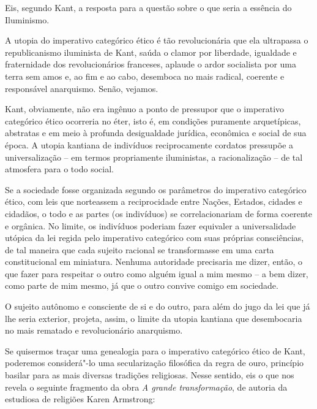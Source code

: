 Eis, segundo Kant, a resposta para a questão sobre o que seria a
essência do Iluminismo.

A utopia do imperativo categórico ético é tão revolucionária que ela
ultrapassa o republicanismo iluminista de Kant, saúda o clamor por
liberdade, igualdade e fraternidade dos revolucionários franceses,
aplaude o ardor socialista por uma terra sem amos e, ao fim e ao cabo,
desemboca no mais radical, coerente e responsável anarquismo. Senão,
vejamos.

Kant, obviamente, não era ingênuo a ponto de pressupor que o imperativo
categórico ético ocorreria no éter, isto é, em condições puramente
arquetípicas, abstratas e em meio à profunda desigualdade jurídica,
econômica e social de sua época. A utopia kantiana de indivíduos
reciprocamente cordatos pressupõe a universalização -- em termos
propriamente iluministas, a racionalização -- de tal atmosfera para o
todo social.

Se a sociedade fosse organizada segundo os parâmetros do imperativo
categórico ético, com leis que norteassem a reciprocidade entre Nações,
Estados, cidades e cidadãos, o todo e as partes (os indivíduos) se
correlacionariam de forma coerente e orgânica. No limite, os indivíduos
poderiam fazer equivaler a universalidade utópica da lei regida pelo
imperativo categórico com suas próprias consciências, de tal maneira que
cada sujeito racional se transformasse em uma carta constitucional em
miniatura. Nenhuma autoridade precisaria me dizer, então, o que fazer
para respeitar o outro como alguém igual a mim mesmo -- a bem dizer,
como parte de mim mesmo, já que o outro convive comigo em sociedade.

O sujeito autônomo e consciente de si e do outro, para além do jugo da
lei que já lhe seria exterior, projeta, assim, o limite da utopia
kantiana que desembocaria no mais rematado e revolucionário anarquismo.

Se quisermos traçar uma genealogia para o imperativo categórico ético de
Kant, poderemos considerá"-lo uma secularização filosófica da regra de
ouro, princípio basilar para as mais diversas tradições religiosas.
Nesse sentido, eis o que nos revela o seguinte fragmento da obra \emph{A
grande transformação}, de autoria da estudiosa de religiões Karen
Armstrong:

